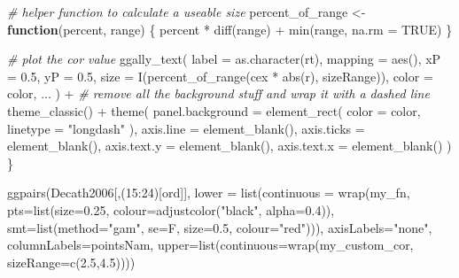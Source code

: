 \documentclass[
  10pt,
  b5paper]{book}
\newenvironment{Shaded}{\begin{snugshade}}{\end{snugshade}}
\newcommand{\AttributeTok}[1]{\textcolor[rgb]{0.77,0.63,0.00}{#1}}
\newcommand{\CommentTok}[1]{\textcolor[rgb]{0.56,0.35,0.01}{\textit{#1}}}
\newcommand{\ConstantTok}[1]{\textcolor[rgb]{0.00,0.00,0.00}{#1}}
\newcommand{\ControlFlowTok}[1]{\textcolor[rgb]{0.13,0.29,0.53}{\textbf{#1}}}
\newcommand{\DecValTok}[1]{\textcolor[rgb]{0.00,0.00,0.81}{#1}}
\newcommand{\FloatTok}[1]{\textcolor[rgb]{0.00,0.00,0.81}{#1}}
\newcommand{\FunctionTok}[1]{\textcolor[rgb]{0.00,0.00,0.00}{#1}}
\newcommand{\NormalTok}[1]{#1}
\newcommand{\OtherTok}[1]{\textcolor[rgb]{0.56,0.35,0.01}{#1}}
\newcommand{\SpecialCharTok}[1]{\textcolor[rgb]{0.00,0.00,0.00}{#1}}
\newcommand{\StringTok}[1]{\textcolor[rgb]{0.31,0.60,0.02}{#1}}
\begin{document}
\begin{Shaded}
\begin{Highlighting}[]
  \CommentTok{\# helper function to calculate a useable size}
\NormalTok{  percent\_of\_range }\OtherTok{\textless{}{-}} \ControlFlowTok{function}\NormalTok{(percent, range) \{}
\NormalTok{    percent }\SpecialCharTok{*} \FunctionTok{diff}\NormalTok{(range) }\SpecialCharTok{+} \FunctionTok{min}\NormalTok{(range, }\AttributeTok{na.rm =} \ConstantTok{TRUE}\NormalTok{)}
\NormalTok{  \}}

  \CommentTok{\# plot the cor value}
  \FunctionTok{ggally\_text}\NormalTok{(}
    \AttributeTok{label =} \FunctionTok{as.character}\NormalTok{(rt), }
    \AttributeTok{mapping =} \FunctionTok{aes}\NormalTok{(),}
    \AttributeTok{xP =} \FloatTok{0.5}\NormalTok{, }\AttributeTok{yP =} \FloatTok{0.5}\NormalTok{, }
    \AttributeTok{size =} \FunctionTok{I}\NormalTok{(}\FunctionTok{percent\_of\_range}\NormalTok{(cex }\SpecialCharTok{*} \FunctionTok{abs}\NormalTok{(r), sizeRange)),}
    \AttributeTok{color =}\NormalTok{ color,}
\NormalTok{    ...}
\NormalTok{  )  }\SpecialCharTok{+} 
    \CommentTok{\# remove all the background stuff and wrap it with a dashed line}
    \FunctionTok{theme\_classic}\NormalTok{() }\SpecialCharTok{+} 
    \FunctionTok{theme}\NormalTok{(}
      \AttributeTok{panel.background =} \FunctionTok{element\_rect}\NormalTok{(}
        \AttributeTok{color =}\NormalTok{ color, }
        \AttributeTok{linetype =} \StringTok{"longdash"}
\NormalTok{      ), }
      \AttributeTok{axis.line =} \FunctionTok{element\_blank}\NormalTok{(), }
      \AttributeTok{axis.ticks =} \FunctionTok{element\_blank}\NormalTok{(), }
      \AttributeTok{axis.text.y =} \FunctionTok{element\_blank}\NormalTok{(), }
      \AttributeTok{axis.text.x =} \FunctionTok{element\_blank}\NormalTok{()}
\NormalTok{    )}
\NormalTok{\}}

\FunctionTok{ggpairs}\NormalTok{(Decath2006[,(}\DecValTok{15}\SpecialCharTok{:}\DecValTok{24}\NormalTok{)[ord]], }
        \AttributeTok{lower =} \FunctionTok{list}\NormalTok{(}\AttributeTok{continuous =} 
                       \FunctionTok{wrap}\NormalTok{(my\_fn,}
                            \AttributeTok{pts=}\FunctionTok{list}\NormalTok{(}\AttributeTok{size=}\FloatTok{0.25}\NormalTok{, }\AttributeTok{colour=}\FunctionTok{adjustcolor}\NormalTok{(}\StringTok{"black"}\NormalTok{, }\AttributeTok{alpha=}\FloatTok{0.4}\NormalTok{)), }
                            \AttributeTok{smt=}\FunctionTok{list}\NormalTok{(}\AttributeTok{method=}\StringTok{"gam"}\NormalTok{, }\AttributeTok{se=}\NormalTok{F, }\AttributeTok{size=}\FloatTok{0.5}\NormalTok{, }\AttributeTok{colour=}\StringTok{"red"}\NormalTok{))),}
        \AttributeTok{axisLabels=}\StringTok{"none"}\NormalTok{, }\AttributeTok{columnLabels=}\NormalTok{pointsNam,}
        \AttributeTok{upper=}\FunctionTok{list}\NormalTok{(}\AttributeTok{continuous=}\FunctionTok{wrap}\NormalTok{(my\_custom\_cor, }\AttributeTok{sizeRange=}\FunctionTok{c}\NormalTok{(}\FloatTok{2.5}\NormalTok{,}\FloatTok{4.5}\NormalTok{))))}
\end{Highlighting}
\end{Shaded}
\end{document}
